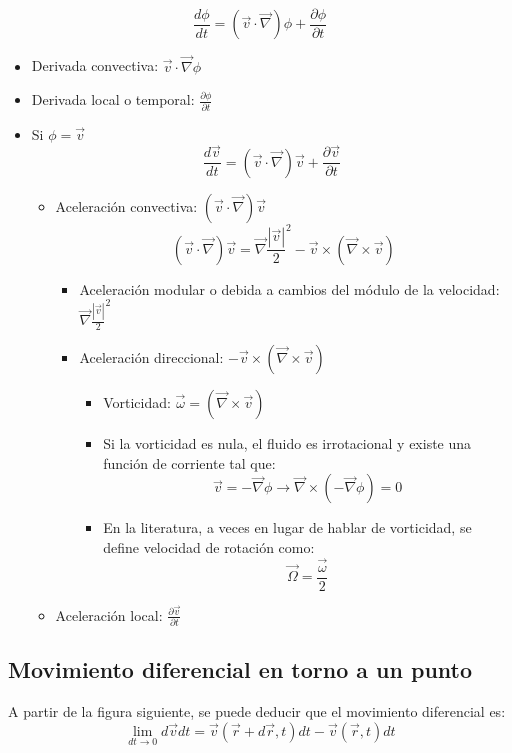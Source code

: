 \[\frac{d\phi}{dt}=\left(\vec{v} \cdot\vec{\nabla}\right)\phi +\frac{\partial \phi}{\partial t} \]
\begin{itemize}
	\item Derivada convectiva: $\vec{v} \cdot\vec{\nabla}\phi$
	\item Derivada local o temporal: $\frac{\partial \phi}{\partial t}$
	\item Si $\phi = \vec{v}$
	\[\frac{d\vec{v}}{dt}=(\vec{v} \cdot\vec{\nabla})\vec{v}+\frac{\partial \vec v}{\partial t} \]
	\begin{itemize}
		\item Aceleración convectiva: $(\vec{v} \cdot\vec{\nabla})\vec{v}$
		\[(\vec{v} \cdot\vec{\nabla})\vec{v}=\vec{\nabla}\frac{|\vec{v}|}{2}^2-\vec{v} \times \left(\vec{\nabla}\times\vec{v}\right)\]
		\begin{itemize}
			\item Aceleración modular o debida a cambios del módulo de la velocidad: $\vec{\nabla}\frac{|\vec{v}|}{2}^2$
			\item Aceleración direccional: $-\vec{v} \times \left(\vec{\nabla}\times\vec{v}\right)$
			\begin{itemize}
				\item Vorticidad: $\vec{\omega}= \left(\vec{\nabla}\times\vec{v}\right)$
			
				\item Si la vorticidad es nula, el fluido es irrotacional y existe una función de corriente tal que:
				\[\vec{v}=-\vec{\nabla}\phi \rightarrow \vec{\nabla}\times\left(-\vec{\nabla}\phi\right)=0\]
				\item  En la literatura, a veces en lugar de hablar de vorticidad, se define velocidad de rotación como:
				\[\vec{\Omega}=\frac{\vec{\omega}}{2}\]
			\end{itemize}
		\end{itemize}
		\item Aceleración local: $\frac{\partial \vec v}{\partial t}$
	\end{itemize}
\end{itemize}
\newpage
\subsection{Movimiento diferencial en torno a un punto}
A partir de la figura siguiente, se puede deducir que el movimiento diferencial es:
\[\lim_{{dt \to 0}} d\vec{v}dt=\vec{v}(\vec{r}+d\vec{r},t)dt-\vec{v}(\vec r ,t)dt\]


